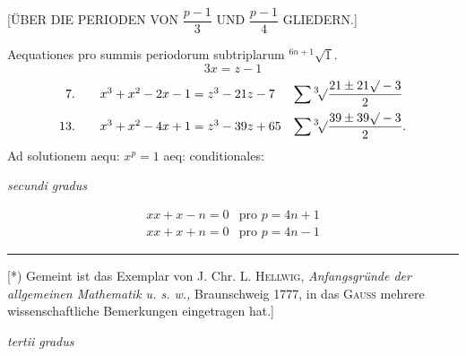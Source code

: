 \NoSourceHead
\begin{center}\large{}\end{center}
\begin{center}[ÜBER DIE PERIODEN VON $\dfrac{p-1}{3}$ UND $\dfrac{p-1}{4}$ GLIEDERN.]\end{center}
\noindent\hspace*{\parindent}Aequationes pro summis periodorum subtriplarum ${}^{6n+1}\!\surd1$.
\[
3x=z-1
\]
\[
\begin{array}{r@{\qquad}l@{\quad}l}
7.&x^3+x^2-2x-1=z^3-21z-7&\displaystyle\sum{}^3\!\surd\frac{21\pm21\surd-3}{2}\\[8pt]
13.&x^3+x^2-4x+1=z^3-39z+65&\displaystyle\sum{}^3\!\surd\frac{39\pm39\surd-3}{2}.
\end{array}
\]
\noindent\hspace*{\parindent}Ad solutionem aequ: $x^p=1$ aeq: conditionales:
\begin{center}\textit{secundi gradus}\end{center}
\[
\begin{array}{r|l}
xx+x-n=0&\text{pro }p=4n+1\\
xx+x+n=0&\text{pro }p=4n-1
\end{array}
\]
\par\smallskip\noindent\rule{.25\linewidth}{.4pt}\par\smallskip
{\small\noindent\hspace*{\parindent}[*) Gemeint ist das Exemplar von J. Chr. L. \textsc{Hellwig},
\textit{Anfangsgründe der allgemeinen Mathematik u. s. w.,} Braunschweig 1777, in das \textsc{Gauss}
mehrere wissenschaftliche Bemerkungen eingetragen hat.]\par}
\clearpage
{}
\begin{center}\textit{tertii gradus}\end{center}
\begin{center}
\setlength{\arraycolsep}{5pt}\renewcommand{\arraystretch}{1.6}
\end{center}

